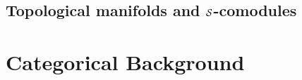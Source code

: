 \documentclass[12pt,oneside]{book}
\begin{document}
    \section{Topological manifolds and $\S$-comodules}
    

  \appendix

  \chapter{Categorical Background}
    


    
    
    \nocite{*}
\end{document}
